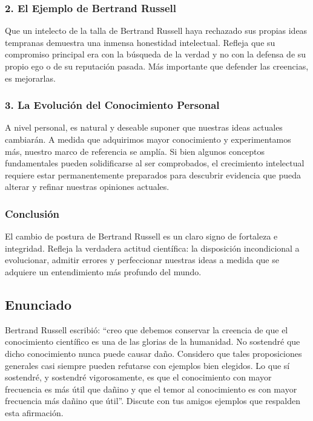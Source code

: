 \documentclass[12pt, a4paper]{article}
\begin{document}
\subsubsection*{2. El Ejemplo de Bertrand Russell}
Que un intelecto de la talla de Bertrand Russell haya rechazado sus propias ideas tempranas demuestra una inmensa honestidad intelectual. Refleja que su compromiso principal era con la búsqueda de la verdad y no con la defensa de su propio ego o de su reputación pasada. Más importante que defender las creencias, es mejorarlas.

\subsubsection*{3. La Evolución del Conocimiento Personal}
A nivel personal, es natural y deseable suponer que nuestras ideas actuales cambiarán. A medida que adquirimos mayor conocimiento y experimentamos más, nuestro marco de referencia se amplía. Si bien algunos conceptos fundamentales pueden solidificarse al ser comprobados, el crecimiento intelectual requiere estar permanentemente preparados para descubrir evidencia que pueda alterar y refinar nuestras opiniones actuales.

\subsubsection*{Conclusión}
El cambio de postura de Bertrand Russell es un claro signo de fortaleza e integridad. Refleja la verdadera actitud científica: la disposición incondicional a evolucionar, admitir errores y perfeccionar nuestras ideas a medida que se adquiere un entendimiento más profundo del mundo.


\newpage

\subsection*{Enunciado}
Bertrand Russell escribió: ``creo que debemos conservar la creencia de que el conocimiento científico es una de las glorias de la humanidad. No sostendré que dicho conocimiento nunca puede causar daño. Considero que tales proposiciones generales casi siempre pueden refutarse con ejemplos bien elegidos. Lo que sí sostendré, y sostendré vigorosamente, es que el conocimiento con mayor frecuencia es más útil que dañino y que el temor al conocimiento es con mayor frecuencia más dañino que útil''. Discute con tus amigos ejemplos que respalden esta afirmación.
\end{document}
